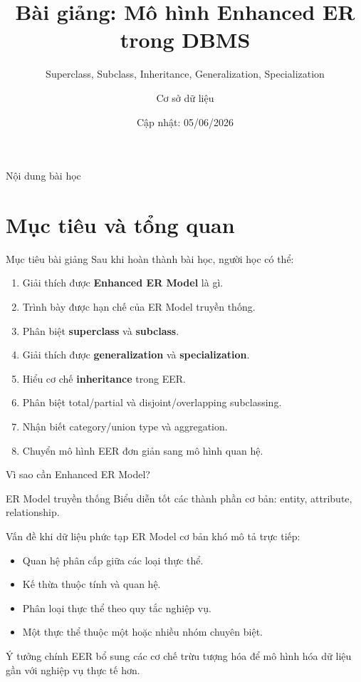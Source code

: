 \documentclass[aspectratio=169,11pt]{beamer}
\title[Bài giảng EER]{Bài giảng: Mô hình Enhanced ER trong DBMS}
\subtitle{Superclass, Subclass, Inheritance, Generalization, Specialization}
\author{Cơ sở dữ liệu}
\institute{Database Modeling}
\date{Cập nhật: 05/06/2026}
\newcommand{\concept}[1]{\textcolor{NEUBlue}{\textbf{#1}}}
\begin{document}
\begin{frame}
  \titlepage
\end{frame}

\begin{frame}{Nội dung bài học}
\tableofcontents
\end{frame}

\section{Mục tiêu và tổng quan}

\begin{frame}{Mục tiêu bài giảng}
Sau khi hoàn thành bài học, người học có thể:
\begin{enumerate}
    \item Giải thích được \concept{Enhanced ER Model} là gì.
    \item Trình bày được hạn chế của ER Model truyền thống.
    \item Phân biệt \concept{superclass} và \concept{subclass}.
    \item Giải thích được \concept{generalization} và \concept{specialization}.
    \item Hiểu cơ chế \concept{inheritance} trong EER.
    \item Phân biệt total/partial và disjoint/overlapping subclassing.
    \item Nhận biết category/union type và aggregation.
    \item Chuyển mô hình EER đơn giản sang mô hình quan hệ.
\end{enumerate}
\end{frame}

\begin{frame}{Vì sao cần Enhanced ER Model?}
\begin{block}{ER Model truyền thống}
Biểu diễn tốt các thành phần cơ bản: entity, attribute, relationship.
\end{block}

\begin{block}{Vấn đề khi dữ liệu phức tạp}
ER Model cơ bản khó mô tả trực tiếp:
\begin{itemize}
    \item Quan hệ phân cấp giữa các loại thực thể.
    \item Kế thừa thuộc tính và quan hệ.
    \item Phân loại thực thể theo quy tắc nghiệp vụ.
    \item Một thực thể thuộc một hoặc nhiều nhóm chuyên biệt.
\end{itemize}
\end{block}

\begin{alertblock}{Ý tưởng chính}
EER bổ sung các cơ chế trừu tượng hóa để mô hình hóa dữ liệu gần với nghiệp vụ thực tế hơn.
\end{alertblock}
\end{frame}
\end{document}
